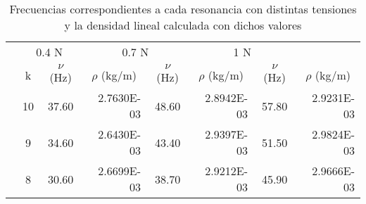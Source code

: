 \begin{table}
    \scriptsize
    \centering
    \caption{Frecuencias correspondientes a cada resonancia con distintas tensiones y la densidad lineal calculada con dichos valores}
      \begin{tabular}{|rr|r|r|r|r|r|r|}
      \hline
      \rowcolor[rgb]{ .788,  .788,  .788} \multicolumn{2}{|r|}{\small{Tensión}} & \multicolumn{2}{c|}{\small{0.4 N}} & \multicolumn{2}{c|}{\small{0.7 N}} & \multicolumn{2}{c|}{\small{1 N}} \bigstrut\\
  \cline{2-8}    \rowcolor[rgb]{ .788,  .788,  .788} \multicolumn{1}{|c|}{} & \multicolumn{1}{c|}{\cellcolor[rgb]{ .929,  .929,  .929}k} & \multicolumn{1}{c|}{\cellcolor[rgb]{ .929,  .929,  .929}$\nu$ (Hz)} & \multicolumn{1}{c|}{\cellcolor[rgb]{ .929,  .929,  .929}$\rho$ (kg/m)} & \multicolumn{1}{c|}{\cellcolor[rgb]{ .929,  .929,  .929}$\nu$ (Hz)} & \multicolumn{1}{c|}{\cellcolor[rgb]{ .929,  .929,  .929}$\rho$ (kg/m)} & \multicolumn{1}{c|}{\cellcolor[rgb]{ .929,  .929,  .929}$\nu$ (Hz)} & \multicolumn{1}{c|}{\cellcolor[rgb]{ .929,  .929,  .929}$\rho$ (kg/m)} \bigstrut\\
  \cline{2-8}    \rowcolor[rgb]{ .788,  .788,  .788} \multicolumn{1}{|c|}{} & \multicolumn{1}{c|}{\cellcolor[rgb]{ 1,  1,  1}10} & \multicolumn{1}{c|}{\cellcolor[rgb]{ 1,  1,  1}37.60} & \cellcolor[rgb]{ 1,  1,  1}2.7630E-03 & \multicolumn{1}{c|}{\cellcolor[rgb]{ 1,  1,  1}48.60} & \cellcolor[rgb]{ 1,  1,  1}2.8942E-03 & \multicolumn{1}{c|}{\cellcolor[rgb]{ 1,  1,  1}57.80} & \cellcolor[rgb]{ 1,  1,  1}2.9231E-03 \bigstrut\\
  \cline{2-8}    \rowcolor[rgb]{ .788,  .788,  .788} \multicolumn{1}{|c|}{} & \multicolumn{1}{c|}{\cellcolor[rgb]{ 1,  1,  1}9} & \multicolumn{1}{c|}{\cellcolor[rgb]{ 1,  1,  1}34.60} & \cellcolor[rgb]{ 1,  1,  1}2.6430E-03 & \multicolumn{1}{c|}{\cellcolor[rgb]{ 1,  1,  1}43.40} & \cellcolor[rgb]{ 1,  1,  1}2.9397E-03 & \multicolumn{1}{c|}{\cellcolor[rgb]{ 1,  1,  1}51.50} & \cellcolor[rgb]{ 1,  1,  1}2.9824E-03 \bigstrut\\
  \cline{2-8}    \rowcolor[rgb]{ .788,  .788,  .788} \multicolumn{1}{|c|}{} & \multicolumn{1}{c|}{\cellcolor[rgb]{ 1,  1,  1}8} & \multicolumn{1}{c|}{\cellcolor[rgb]{ 1,  1,  1}30.60} & \cellcolor[rgb]{ 1,  1,  1}2.6699E-03 & \multicolumn{1}{c|}{\cellcolor[rgb]{ 1,  1,  1}38.70} & \cellcolor[rgb]{ 1,  1,  1}2.9212E-03 & \multicolumn{1}{c|}{\cellcolor[rgb]{ 1,  1,  1}45.90} & \cellcolor[rgb]{ 1,  1,  1}2.9666E-03 \bigstrut\\

\end{tabular}
\end{table}
